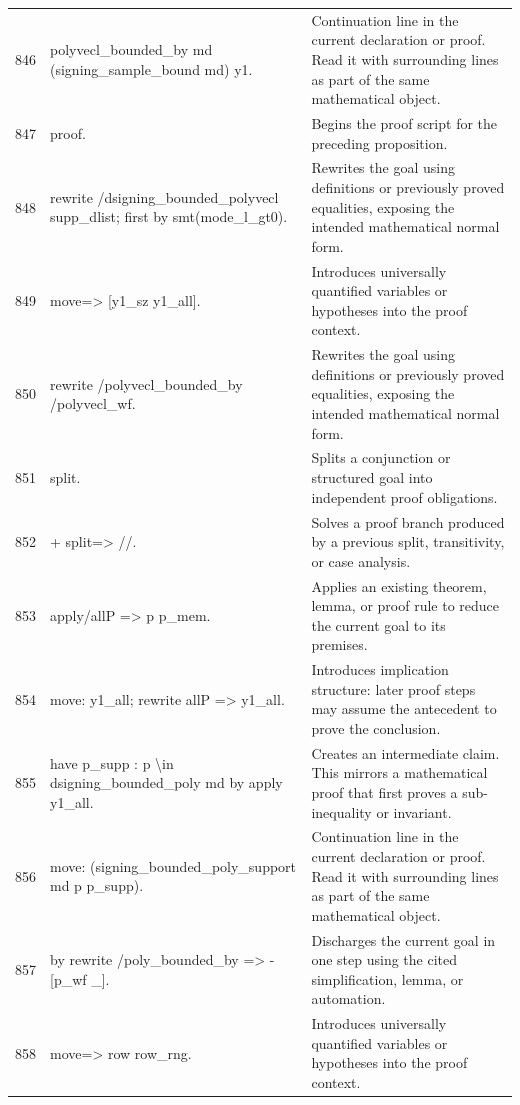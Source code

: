 \documentclass[10pt]{article}
\begin{document}
\begin{longtable}{r L{0.53\textwidth} L{0.37\textwidth}}
846 & {\ttfamily\scriptsize   polyvecl\_bounded\_by md (signing\_sample\_bound md) y1.} & Continuation line in the current declaration or proof.  Read it with surrounding lines as part of the same mathematical object. \\
847 & {\ttfamily\scriptsize proof.} & Begins the proof script for the preceding proposition. \\
848 & {\ttfamily\scriptsize rewrite /dsigning\_bounded\_polyvecl supp\_dlist; first by smt(mode\_l\_gt0).} & Rewrites the goal using definitions or previously proved equalities, exposing the intended mathematical normal form. \\
849 & {\ttfamily\scriptsize move=> [y1\_sz y1\_all].} & Introduces universally quantified variables or hypotheses into the proof context. \\
850 & {\ttfamily\scriptsize rewrite /polyvecl\_bounded\_by /polyvecl\_wf.} & Rewrites the goal using definitions or previously proved equalities, exposing the intended mathematical normal form. \\
851 & {\ttfamily\scriptsize split.} & Splits a conjunction or structured goal into independent proof obligations. \\
852 & {\ttfamily\scriptsize + split=> //.} & Solves a proof branch produced by a previous split, transitivity, or case analysis. \\
853 & {\ttfamily\scriptsize   apply/allP => p p\_mem.} & Applies an existing theorem, lemma, or proof rule to reduce the current goal to its premises. \\
854 & {\ttfamily\scriptsize   move: y1\_all; rewrite allP => y1\_all.} & Introduces implication structure: later proof steps may assume the antecedent to prove the conclusion. \\
855 & {\ttfamily\scriptsize   have p\_supp : p \textbackslash{}in dsigning\_bounded\_poly md by apply y1\_all.} & Creates an intermediate claim.  This mirrors a mathematical proof that first proves a sub-inequality or invariant. \\
856 & {\ttfamily\scriptsize   move: (signing\_bounded\_poly\_support md p p\_supp).} & Continuation line in the current declaration or proof.  Read it with surrounding lines as part of the same mathematical object. \\
857 & {\ttfamily\scriptsize   by rewrite /poly\_bounded\_by => -[p\_wf \_].} & Discharges the current goal in one step using the cited simplification, lemma, or automation. \\
858 & {\ttfamily\scriptsize move=> row row\_rng.} & Introduces universally quantified variables or hypotheses into the proof context. \\

\end{longtable}
\end{document}
